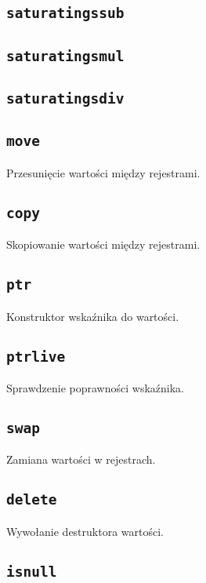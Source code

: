 \subsection{\texttt{saturatingssub}}
\subsection{\texttt{saturatingsmul}}
\subsection{\texttt{saturatingsdiv}}

\subsection{\texttt{move}}

Przesunięcie wartości między rejestrami.

\subsection{\texttt{copy}}

Skopiowanie wartości między rejestrami.

\subsection{\texttt{ptr}}

Konstruktor wskaźnika do wartości.

\subsection{\texttt{ptrlive}}

Sprawdzenie poprawności wskaźnika.

\subsection{\texttt{swap}}

Zamiana wartości w rejestrach.

\subsection{\texttt{delete}}

Wywołanie destruktora wartości.

\subsection{\texttt{isnull}}

